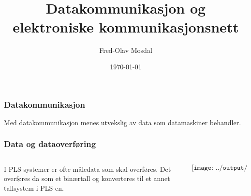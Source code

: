 \documentclass[aspectratio=169,xcolor=dvipsnames]{beamer}
\title[COM]{Datakommunikasjon og elektroniske kommunikasjonsnett} %
\author[Fred-Olav] {Fred-Olav Mosdal}
\institute[Gand VGS] %
{
    Gand VGS \\
    VG3 Automasjon }
\date{\today} %
\begin{document}
\begin{frame}
\titlepage
\end{frame}

\begin{frame}
	\frametitle{Datakommunikasjon}
Med datakommunikasjon menes utvekslig av data som datamaskiner behandler. 
\end{frame}




\begin{frame}
	\frametitle{Data og dataoverføring}
	\begin{columns}
		\begin{column}{0.5\textwidth}
I PLS systemer er ofte måledata som skal overføres. Det overføres da som et binærtall og konverteres til et annet tallsystem i PLS-en. 

			
		\end{column}

		\begin{column}{0.5\textwidth}
	$$\texttt{[image: ../output/noGPLimages/kap5x01]}$$
		\end{column}
	\end{columns}
\end{frame}
\end{document}
